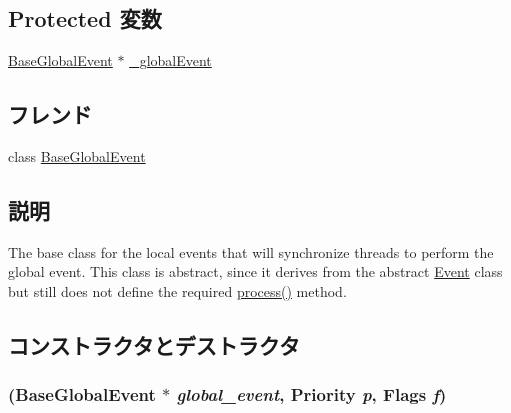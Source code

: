 \subsection*{Protected 変数}
\begin{DoxyCompactItemize}
\item 
\hyperlink{classBaseGlobalEvent}{BaseGlobalEvent} $\ast$ \hyperlink{classBaseGlobalEvent_1_1BarrierEvent_ac2b463c3aa6e837d82bc03a267c8e4eb}{\_\-globalEvent}
\end{DoxyCompactItemize}
\subsection*{フレンド}
\begin{DoxyCompactItemize}
\item 
class \hyperlink{classBaseGlobalEvent_1_1BarrierEvent_abb0ec5ec7e3cd370f8ee27b8cdd5a8d3}{BaseGlobalEvent}
\end{DoxyCompactItemize}


\subsection{説明}
The base class for the local events that will synchronize threads to perform the global event. This class is abstract, since it derives from the abstract \hyperlink{classEvent}{Event} class but still does not define the required \hyperlink{classEvent_a142b75b68a6291400e20fb0dd905b1c8}{process()} method. 

\subsection{コンストラクタとデストラクタ}
\hypertarget{classBaseGlobalEvent_1_1BarrierEvent_a9b16536f17a949fbf1c0c96ae5f7e427}{
\subsubsection[{BarrierEvent}]{ ({\bf BaseGlobalEvent} $\ast$ {\em global\_\-event}, \/  {\bf Priority} {\em p}, \/  {\bf Flags} {\em f})}}
\label{classBaseGlobalEvent_1_1BarrierEvent_a9b16536f17a949fbf1c0c96ae5f7e427}



